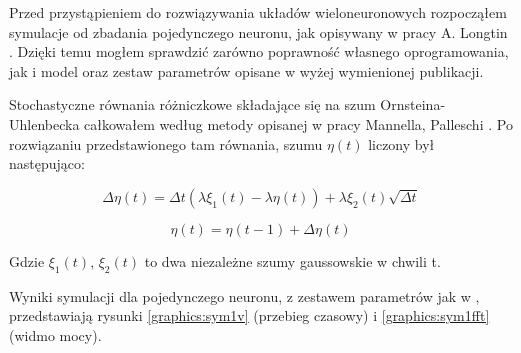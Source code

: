   Przed przystąpieniem do rozwiązywania układów wieloneuronowych rozpocząłem symulacje od zbadania pojedynczego neuronu, jak opisywany w pracy A. Longtin \cite{longtin}. Dzięki temu mogłem sprawdzić zarówno poprawność własnego oprogramowania, jak i model oraz zestaw parametrów opisane w wyżej wymienionej publikacji.
  
  Stochastyczne równania różniczkowe składające się na szum Ornsteina-Uhlenbecka całkowałem według metody opisanej w pracy Mannella, Palleschi \cite{mannella}. Po rozwiązaniu przedstawionego tam równania, szumu $\eta (t)$ liczony był następująco:

  \begin{equation} \label{eq:deta:final}
    \Delta \eta(t) = \Delta t(\lambda \xi_1(t) - \lambda \eta(t)) + \lambda \xi_2(t) \sqrt{\Delta t}
  \end{equation}

  \begin{equation} \label{eq:eta:final}
    \eta(t) = \eta(t-1) + \Delta \eta(t)
  \end{equation}

  Gdzie $\xi_1(t)$, $\xi_2(t)$ to dwa niezależne szumy gaussowskie w chwili t.
  
  Wyniki symulacji dla pojedynczego neuronu, z zestawem parametrów jak w \cite{longtin}, przedstawiają rysunki \ref{graphics:sym1v} (przebieg czasowy) i \ref{graphics:sym1fft} (widmo mocy).

